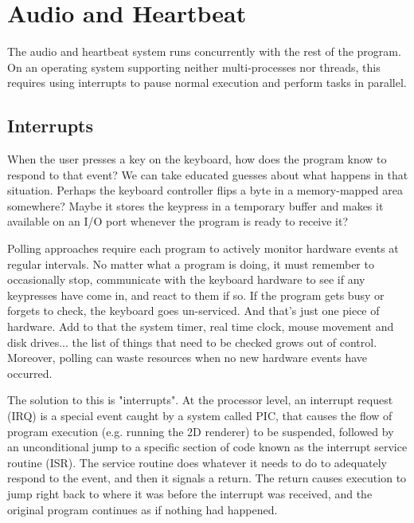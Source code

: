 \documentclass[book.tex]{subfiles}
\begin{document}
\section{Audio and Heartbeat} 
\label{audio_and_heartbeat}
The audio and heartbeat system runs concurrently with the rest of the program. On an operating system supporting neither multi-processes nor threads, this requires using interrupts to pause normal execution and perform tasks in parallel.\\

\subsection{Interrupts}
When the user presses a key on the keyboard, how does the program know to respond to that event? We can take educated guesses about what happens in that situation. Perhaps the keyboard controller flips a byte in a memory-mapped area somewhere? Maybe it stores the keypress in a temporary buffer and makes it available on an I/O port whenever the program is ready to receive it?\\

\par
Polling approaches require each program to actively monitor hardware events at regular intervals. No matter what a program is doing, it must remember to occasionally stop, communicate with the keyboard hardware to see if any keypresses have come in, and react to them if so. If the program gets busy or forgets to check, the keyboard goes un-serviced. And that's just one piece of hardware. Add to that the system timer, real time clock, mouse movement and disk drives... the list of things that need to be checked grows out of control. Moreover, polling can waste resources when no new hardware events have occurred.\\

\par
The solution to this is "interrupts". At the processor level, an interrupt request (IRQ) is a special event caught by a system called PIC, that causes the flow of program execution (e.g. running the 2D renderer) to be suspended, followed by an unconditional jump to a specific section of code known as the interrupt service routine (ISR). The service routine does whatever it needs to do to adequately respond to the event, and then it signals a return. The return causes execution to jump right back to where it was before the interrupt was received, and the original program continues as if nothing had happened. \\
\end{document}
